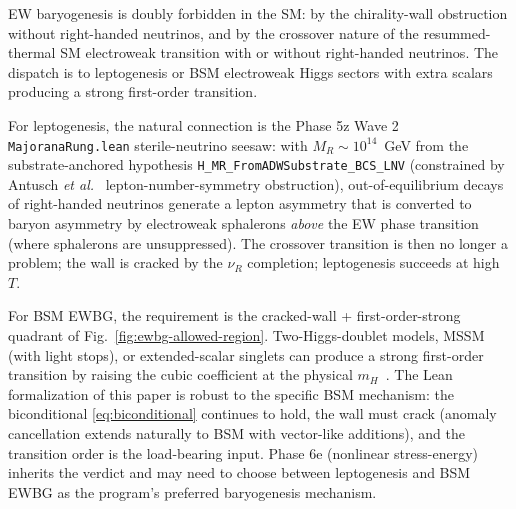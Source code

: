 \documentclass[aps,prl,twocolumn,showpacs,superscriptaddress,nofootinbib]{revtex4-2}
\begin{document}
EW baryogenesis is doubly forbidden in the SM: by the chirality-wall
obstruction without right-handed neutrinos, and by the crossover
nature of the resummed-thermal SM electroweak transition with or
without right-handed neutrinos. The dispatch is to leptogenesis or
BSM electroweak Higgs sectors with extra scalars producing a strong
first-order transition.

For leptogenesis, the natural connection is the Phase 5z Wave 2
\texttt{MajoranaRung.lean} sterile-neutrino seesaw: with
$M_R \sim 10^{14}$~GeV from the substrate-anchored hypothesis
\texttt{H\_MR\_FromADWSubstrate\_BCS\_LNV} (constrained by Antusch
\textit{et al.}~\cite{Antusch2003} lepton-number-symmetry obstruction),
out-of-equilibrium decays of right-handed neutrinos
generate a lepton asymmetry that is converted to baryon asymmetry by
electroweak sphalerons \emph{above} the EW phase transition (where
sphalerons are unsuppressed). The crossover transition is then no
longer a problem; the wall is cracked by the $\nu_R$ completion;
leptogenesis succeeds at high $T$.

For BSM EWBG, the requirement is the cracked-wall + first-order-strong
quadrant of Fig.~\ref{fig:ewbg-allowed-region}. Two-Higgs-doublet
models, MSSM (with light stops), or extended-scalar singlets can
produce a strong first-order transition by raising the cubic
coefficient at the physical $m_H$~\cite{ProfumoRamsey2007}. The
Lean formalization of this paper is robust to the specific BSM
mechanism: the biconditional \eqref{eq:biconditional} continues to
hold, the wall must crack (anomaly cancellation extends naturally to
BSM with vector-like additions), and the transition order is the
load-bearing input. Phase 6e (nonlinear stress-energy) inherits the
verdict and may need to choose between leptogenesis and BSM EWBG as
the program's preferred baryogenesis mechanism.
\end{document}
